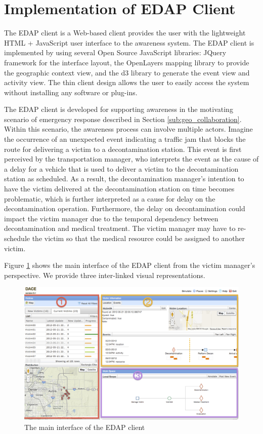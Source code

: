 \section{Implementation of EDAP Client} %
\label{sec:implementation_of_edap_client}
The EDAP client is a Web-based client provides the user with the lightweight HTML + JavaScript user interface to the awareness system. The EDAP client is implemented by using several Open Source JavaScript libraries: JQuery framework for the interface layout, the OpenLayers mapping library to provide the geographic context view, and the d3 library to generate the event view and activity view. The thin client design allows the user to easily access the system without installing any software or plug-ins. 

The EDAP client is developed for supporting awareness in the motivating scenario of emergency response described in Section \ref{sub:geo_collaboration}. Within this scenario, the awareness process can involve multiple actors. Imagine the occurrence of an unexpected event indicating a traffic jam that blocks the route for delivering a victim to a decontamination station. This event is first perceived by the transportation manager, who interprets the event as the cause of a delay for a vehicle that is used to deliver a victim to the decontamination station as scheduled. As a result, the decontamination manager’s intention to have the victim delivered at the decontamination station on time becomes problematic, which is further interpreted as a cause for delay on the decontamination operation. Furthermore, the delay on decontamination could impact the victim manager due to the temporal dependency between decontamination and medical treatment. The victim manager may have to re-schedule the victim so that the medical resource could be assigned to another victim.

Figure \ref{fig:main_interface} shows the main interface of the EDAP client from the victim manager’s perspective. We provide three inter-linked visual representations. 

\begin{figure}[htbp] %
	\centering
	\includegraphics[width=5.5in]{main_interface.jpg} 
	\caption{The main interface of the EDAP client}
	\label{fig:main_interface}
\end{figure}


